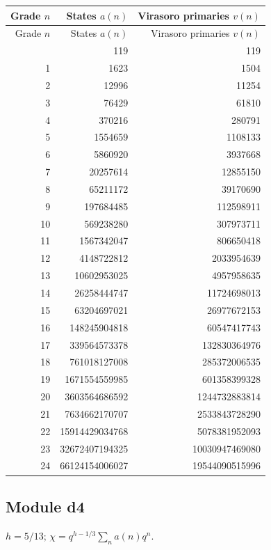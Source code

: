 \begingroup\small
\setlength{\tabcolsep}{5pt}
\begin{longtable}{@{}rrr@{}}
\toprule
Grade $n$ & States $a(n)$ & Virasoro primaries $v(n)$\\
\midrule\endfirsthead
\toprule
Grade $n$ & States $a(n)$ & Virasoro primaries $v(n)$\\
\midrule\endhead
\bottomrule\endfoot
0 & 119 & 119\\
1 & 1623 & 1504\\
2 & 12996 & 11254\\
3 & 76429 & 61810\\
4 & 370216 & 280791\\
5 & 1554659 & 1108133\\
6 & 5860920 & 3937668\\
7 & 20257614 & 12855150\\
8 & 65211172 & 39170690\\
9 & 197684485 & 112598911\\
10 & 569238280 & 307973711\\
11 & 1567342047 & 806650418\\
12 & 4148722812 & 2033954639\\
13 & 10602953025 & 4957958635\\
14 & 26258444747 & 11724698013\\
15 & 63204697021 & 26977672153\\
16 & 148245904818 & 60547417743\\
17 & 339564573378 & 132830364976\\
18 & 761018127008 & 285372006535\\
19 & 1671554559985 & 601358399328\\
20 & 3603564686592 & 1244732883814\\
21 & 7634662170707 & 2533843728290\\
22 & 15914429034768 & 5078381952093\\
23 & 32672407194325 & 10030947469080\\
24 & 66124154006027 & 19544090515996\\
\end{longtable}
\endgroup

\subsection{Module d4}
$h=5/13$; $\chi=q^{h-1/3}\sum_n a(n)q^n$.

